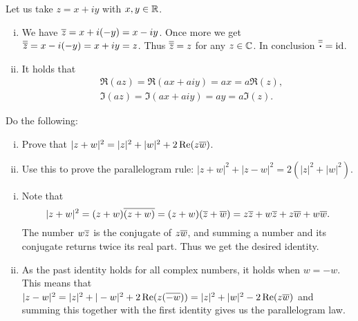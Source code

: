 \documentclass[12pt]{memoir}
\begin{document}
\begin{ptcbr}
    Let us take $z=x+iy$ with $x,y\in\mathbb{R}$.
    \begin{enumerate}[i)]
        \itemsep=-0.4em
        \item We have $\overline z=x+i(-y)=x-iy$. Once more we get $\overline{\overline z}=x-i(-y)=x+iy=z$. Thus $\overline{\overline z}=z$ for any $z\in\mathbb{C}$. In conclusion $\ov{\ov \.}=\id$.
        \item It holds that 
        \begin{align*}
            &\Re(az)=\Re(ax+aiy)=ax=a\Re(z),\\
            &\Im(az)=\Im(ax+aiy)=ay=a\Im(z).
        \end{align*}
    \end{enumerate}
\end{ptcbr}

\begin{Ej}
    Do the following:
    \begin{enumerate}[i)]
        \itemsep=-0.4em
        \item Prove that $|z+w|^2=|z|^2+|w|^2+2\Re(z\overline w)$.
        \item Use this to prove the parallelogram rule: $|z+w|^2+|z-w|^2=2(|z|^2+|w|^2)$.
    \end{enumerate}
\end{Ej}

\begin{ptcbr}
    \begin{enumerate}[i)]
        \itemsep=-0.4em
        \item Note that 
        $$|z+w|^2=(z+w)\overline{(z+w)}=(z+w)(\overline z+\overline w)=z\overline{z}+w\overline{z}+z\overline{w}+w\overline w.$$
        The number $w\overline z$ is the conjugate of $z\overline w$, and summing a number and its conjugate returns twice its real part. Thus we get the desired identity. 
        \item As the past identity holds for all complex numbers, it holds when $w=-w$. This means that 
        $|z-w|^2=|z|^2+|-w|^2+2\Re(z(\overline{-w}))=|z|^2+|w|^2-2\Re(z\overline w)$
        and summing this together with the first identity gives us the parallelogram law.
    \end{enumerate}
\end{ptcbr}
\end{document}
